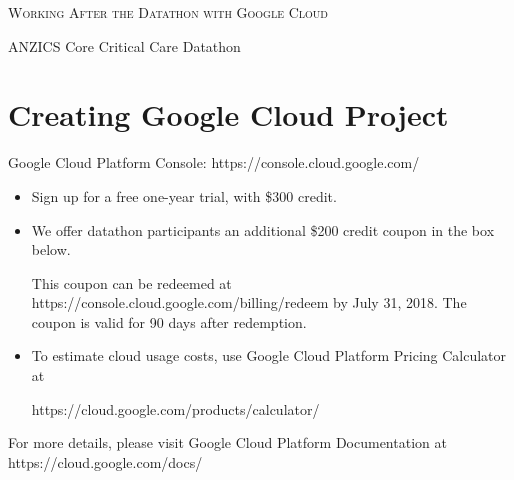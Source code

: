 \begin{center}

\begin{huge}
\textsc{Working After the Datathon with Google Cloud}
\end{huge}

\vspace{3mm}

\begin{Large}
ANZICS Core Critical Care Datathon
\end{Large}
\end{center}

\section*{Creating Google Cloud Project}
Google Cloud Platform Console: https://console.cloud.google.com/
\begin{itemize}
\item Sign up for a free one-year trial, with \$300 credit.
\item We offer datathon participants an additional \$200 credit coupon in the
  box below.
  \begin{center}
  \end{center}
  This coupon can be redeemed at https://console.cloud.google.com/billing/redeem
  by July 31, 2018. The coupon is valid for 90 days after redemption.
\item To estimate cloud usage costs, use Google Cloud Platform Pricing
  Calculator at
  \begin{center}
    https://cloud.google.com/products/calculator/
  \end{center}
\end{itemize}
For more details, please visit Google Cloud Platform Documentation at
https://cloud.google.com/docs/

